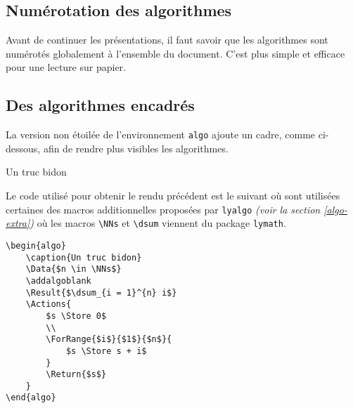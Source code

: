 \documentclass[12pt,a4paper]{article}
\theoremstyle{definition}
\newenvironment{frame-gene}[1][]{
	\begin{tcolorbox}[
		title        = #1, 
		colbacktitle = black!10!white, 
		colback      = white, 
		coltitle     = black,
		fonttitle    = \bfseries\itshape\small, 
		breakable,
		center title]
}{
	\end{tcolorbox}
}
\begin{document}
\subsection{Numérotation des algorithmes}


Avant de continuer les présentations, il faut savoir que les algorithmes sont numérotés globalement à l'ensemble du document. C'est plus simple et efficace pour une lecture sur papier.





\subsection{Des algorithmes encadrés}

La version non étoilée de l'environnement \verb+algo+ ajoute un cadre, comme ci-dessous, afin de rendre plus visibles les algorithmes.

\begin{algo}
    \caption{Un truc bidon}

    \addalgoblank

\end{algo} 


\medskip


Le code utilisé pour obtenir le rendu précédent est le suivant où sont utilisées certaines des macros additionnelles proposées par \verb+lyalgo+ \emph{(voir la section \ref{algo-extra})} où les macros \verb+\NNs+ et \verb+\dsum+ viennent du package \verb+lymath+.

\begin{frame-gene}
    \small
    \begin{verbatim}
\begin{algo}
    \caption{Un truc bidon}
    \Data{$n \in \NNs$}
    \addalgoblank
    \Result{$\dsum_{i = 1}^{n} i$}
    \Actions{
        $s \Store 0$
        \\
        \ForRange{$i$}{$1$}{$n$}{
            $s \Store s + i$
        }
        \Return{$s$}
    }
\end{algo}
	\end{verbatim}
\end{frame-gene}
\end{document}

